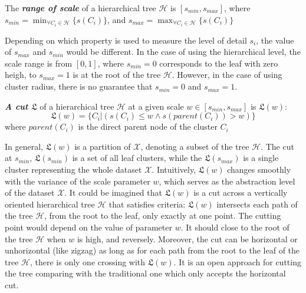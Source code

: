 \begin{definition}
\label{def:range_scale}
 The \textbf{\textit{range of scale}} of a hierarchical tree $\mathcal{H}$ is $[s_{min},s_{max}]$, where $s_{min} = \min_{\forall C_i \in \mathcal{H}}\{s(C_i)\}$, and $s_{max} = \max_{\forall C_i \in \mathcal{H}}\{s(C_i)\}$
\end{definition}
Depending on which property is used to measure the level of detail $s_i$, the value of  $s_{max}$ and  $s_{min}$ would be different. In the case of using the hierarchical level, the scale range is from $[0,1]$, where $s_{min} = 0$ corresponds to the leaf with zero heigh, to $s_{max} = 1$ is at the root of the tree $\mathcal{H}$. However, in the case of using cluster radius, there is no guarantee that $s_{min} = 0$ and $s_{max} = 1$.

\begin{definition}
\label{def:cut}
 \textbf{\textit{A cut $\mathfrak{L}$}} of a hierarchical tree $\mathcal{H}$ at a given scale $w \in [s_{min},s_{max}] $  is $\mathfrak{L}(w)$:
\begin{equation}
\label{equ:a_cut_l}
\mathfrak{L}(w) = \{C_i | (s(C_i) \leq w  \wedge s(parent(C_i)) > w)\}
\end{equation}
where $parent(C_i)$ is the direct parent node of the cluster $C_i$
\end{definition}
In general, $\mathfrak{L}(w)$ is a partition of $\mathcal{X}$, denoting a subset of the tree $\mathcal{H}$. The cut at $s_{min}$, $\mathfrak{L}(s_{min})$ is a set of all leaf clusters, while the $\mathfrak{L}(s_{max})$ is a single cluster representing the whole dataset $\mathcal{X}$. Intuitively, $\mathfrak{L}(w)$ changes smoothly with the variance of the scale parameter $w$, which serves as the abstraction level of the dataset $\mathcal{X}$. It could be imagined that $\mathfrak{L}(w)$ is a cut across a vertically oriented hierarchical tree $\mathcal{H}$ that satisfies criteria: $\mathfrak{L}(w)$ intersects each path of the tree $\mathcal{H}$, from the root to the leaf, only exactly at one point. The cutting point would depend on the value of parameter $w$. It should close to the root of the tree $\mathcal{H}$ when $w$ is high, and reversely. Moreover, the cut can be horizontal or unhorizontal (like zigzag) as long as for each path from the root to the leaf of the tree $\mathcal{H}$, there is only one crossing with $\mathfrak{L}(w)$. It is an open approach for cutting the tree comparing with the traditional one which only accepts the horizontal cut. 

